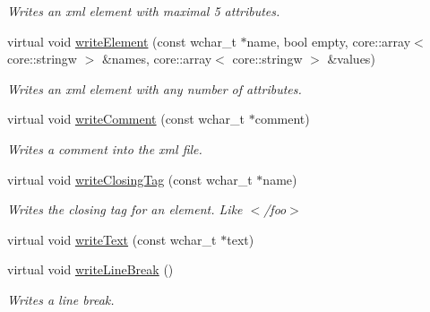 \begin{DoxyCompactItemize}
\begin{DoxyCompactList}\small\item\em Writes an xml element with maximal 5 attributes. \end{DoxyCompactList}\item 
\hypertarget{classirr_1_1io_1_1_c_x_m_l_writer_a38d26784ea3e93a8c4a3380a3c51b2e7}{virtual void \hyperlink{classirr_1_1io_1_1_c_x_m_l_writer_a38d26784ea3e93a8c4a3380a3c51b2e7}{write\-Element} (const wchar\-\_\-t $\ast$name, bool empty, core\-::array$<$ core\-::stringw $>$ \&names, core\-::array$<$ core\-::stringw $>$ \&values)}\label{classirr_1_1io_1_1_c_x_m_l_writer_a38d26784ea3e93a8c4a3380a3c51b2e7}

\begin{DoxyCompactList}\small\item\em Writes an xml element with any number of attributes. \end{DoxyCompactList}\item 
\hypertarget{classirr_1_1io_1_1_c_x_m_l_writer_a72ba84b1d41ecc3f65c40b353e1bc758}{virtual void \hyperlink{classirr_1_1io_1_1_c_x_m_l_writer_a72ba84b1d41ecc3f65c40b353e1bc758}{write\-Comment} (const wchar\-\_\-t $\ast$comment)}\label{classirr_1_1io_1_1_c_x_m_l_writer_a72ba84b1d41ecc3f65c40b353e1bc758}

\begin{DoxyCompactList}\small\item\em Writes a comment into the xml file. \end{DoxyCompactList}\item 
\hypertarget{classirr_1_1io_1_1_c_x_m_l_writer_a926beaf1967335ffc1b28025d7e19bc2}{virtual void \hyperlink{classirr_1_1io_1_1_c_x_m_l_writer_a926beaf1967335ffc1b28025d7e19bc2}{write\-Closing\-Tag} (const wchar\-\_\-t $\ast$name)}\label{classirr_1_1io_1_1_c_x_m_l_writer_a926beaf1967335ffc1b28025d7e19bc2}

\begin{DoxyCompactList}\small\item\em Writes the closing tag for an element. Like $<$/foo$>$ \end{DoxyCompactList}\item 
virtual void \hyperlink{classirr_1_1io_1_1_c_x_m_l_writer_a54ab8acc6ecced56fb220bd2d41c3584}{write\-Text} (const wchar\-\_\-t $\ast$text)
\item 
\hypertarget{classirr_1_1io_1_1_c_x_m_l_writer_a34f237513b64d2b83631acf41b0772ba}{virtual void \hyperlink{classirr_1_1io_1_1_c_x_m_l_writer_a34f237513b64d2b83631acf41b0772ba}{write\-Line\-Break} ()}\label{classirr_1_1io_1_1_c_x_m_l_writer_a34f237513b64d2b83631acf41b0772ba}

\begin{DoxyCompactList}\small\item\em Writes a line break. \end{DoxyCompactList}\end{DoxyCompactItemize}


